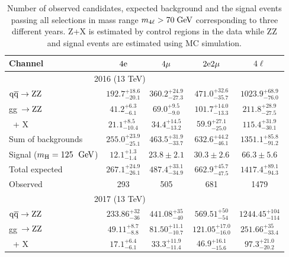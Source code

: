  \begin{table}[!hb]
\begin{center}
\caption{ Number of observed candidates, expected background and the signal events passing all selections in mass range $m_{4\ell} > 70 \hbox{$\;\hbox{\rm GeV}$}$ corresponding to three different years. Z+X is estimated by control regions in the data while ZZ and signal events are estimated using MC simulation. %
\label{tab:EventYieldsH4l}}
\begin{tabular}{|l|c|c|c|c|}
\hline \hline
\textbf{Channel} & $4\mathrm{e}$ & $4{\mu}$ & $2\mathrm{e}2{\mu}$ & $4\ell$ \\
\hline \hline
\multicolumn{4}{|c|}{2016 (13 TeV)}  \\
\hline
$\mathrm{q}\mathrm{\overline{q}} \rightarrow \mathrm{Z}\mathrm{Z}$      & $ 192.7^{+18.6}_{-20.1}$ & $ 360.2^{+24.9}_{-27.3}$ & $ 471.0^{+32.6}_{-35.7}$ & $1023.9^{+68.9}_{-76.0}$ \\
gg~$\rightarrow \mathrm{Z}\mathrm{Z}$                   & $  41.2^{+ 6.3}_{- 6.1}$ & $  69.0^{+ 9.5}_{- 9.0}$ & $ 101.7^{+14.0}_{-13.3}$ & $ 211.8^{+28.9}_{-27.5}$ \\
\Z\ + X               & $  21.1^{+ 8.5}_{-10.4}$ & $  34.4^{+14.5}_{-13.2}$ & $  59.9^{+27.1}_{-25.0}$ & $ 115.4^{+31.9}_{-30.1}$ \\
\hline
Sum of backgrounds      & $ 255.0^{+23.9}_{-25.1}$ & $ 463.5^{+31.9}_{-33.7}$ & $ 632.6^{+44.2}_{-46.1}$ & $1351.1^{+85.8}_{-91.2}$ \\
\hline
Signal ($m_{\mathrm{H}}=125~\hbox{$\;\hbox{\rm GeV}$}$) & $  12.1^{+ 1.3}_{- 1.4}$ & $  23.8\pm2.1$           & $  30.3\pm2.6$           & $  66.3\pm5.6$           \\
\hline
Total expected          & $ 267.1^{+24.9}_{-26.1}$ & $ 487.4^{+33.1}_{-34.9}$ & $ 662.9^{+45.7}_{-47.5}$ & $1417.4^{+89.1}_{-94.3}$ \\
\hline
Observed                & 293 & 505 & 681 & 1479 \\
\hline \hline
\multicolumn{4}{|c|}{2017 (13 TeV)}  \\
\hline
$\mathrm{q}\mathrm{\overline{q}} \rightarrow \mathrm{Z}\mathrm{Z}$ & $233.86^{+32}_{-36 }$ & $441.08^{+ 35}_{- 40}$ & $569.51^{+50}_{-54}$ & $1244.45^{+ 104}_{- 114}$ \\
gg~$\rightarrow \mathrm{Z}\mathrm{Z}$ & $49.11^{+ 8.7}_{- 8.8}$ & $81.50^{+ 11.1}_{- 10.7}$ & $121.05^{+ 17.0}_{- 16.0}$ & $251.66^{+ 35}_{- 33.4}$ \\
\Z\ + X & $17.1^{+ 6.4}_{- 6.1}$ & $33.3^{+ 11.9}_{- 11.4}$ & $46.9^{+ 16.1}_{- 15.6}$ & $97.3^{+ 21.0}_{- 20.2}$ \\

\end{tabular}
\end{center}
\end{table}
